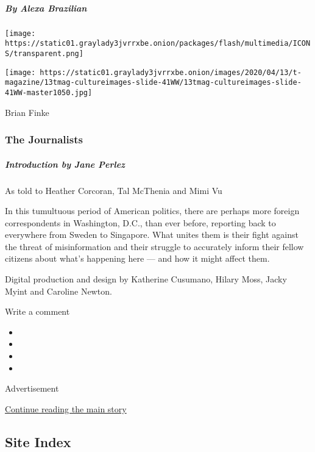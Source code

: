 \hypertarget{by-alexa-brazilian}{%
\subparagraph{By Alexa Brazilian}\label{by-alexa-brazilian}}

\href{https://www.nytimes3xbfgragh.onion/interactive/2020/04/13/t-magazine/foreign-correspondents.html}{}

\texttt{[image: https://static01.graylady3jvrrxbe.onion/packages/flash/multimedia/ICONS/transparent.png]}

\texttt{[image: https://static01.graylady3jvrrxbe.onion/images/2020/04/13/t-magazine/13tmag-cultureimages-slide-41WW/13tmag-cultureimages-slide-41WW-master1050.jpg]}

Brian Finke

\hypertarget{the-journalists}{%
\subsubsection{The Journalists}\label{the-journalists}}

\hypertarget{introduction-by-jane-perlez}{%
\subparagraph{Introduction by Jane
Perlez}\label{introduction-by-jane-perlez}}

As told to Heather Corcoran, Tal McThenia and Mimi Vu

In this tumultuous period of American politics, there are perhaps more
foreign correspondents in Washington, D.C., than ever before, reporting
back to everywhere from Sweden to Singapore. What unites them is their
fight against the threat of misinformation and their struggle to
accurately inform their fellow citizens about what's happening here ---
and how it might affect them.

Digital production and design by Katherine Cusumano, Hilary Moss, Jacky
Myint and Caroline Newton.

Write a comment

\begin{itemize}
\item
\item
\item
\item
\end{itemize}

Advertisement

\protect\hyperlink{after-bottom}{Continue reading the main story}

\hypertarget{site-index}{%
\subsection{Site Index}\label{site-index}}

